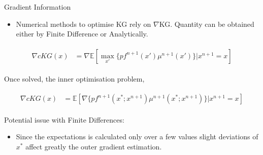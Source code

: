 \documentclass{beamer}
\begin{document}
\begin{frame}{Gradient Information}

\begin{itemize}
	\item Numerical methods to optimise KG rely on $\nabla$KG. Quantity can be obtained either by Finite Difference or Analytically. 
\end{itemize}

\begin{align*}
\begin{split}
\nabla cKG(x) &= \nabla \mathbb{E}[\max_{x'}\{pf^{n+1}(x')\mu^{n+1}(x')\}|x^{n+1}=x]
\end{split}
\end{align*}

Once solved, the inner optimisation problem, 

\begin{align*}
\begin{split}
\nabla cKG(x) &= \mathbb{E}[\nabla \{pf^{n+1}(x^{*};x^{n+1})\mu^{n+1}(x^{*};x^{n+1})\}|x^{n+1}=x]
\end{split}
\end{align*}

Potential issue with Finite Differences:
\begin{itemize}
	\item Since the expectations is calculated only over a few values slight deviations of $x^{*}$ affect greatly the outer gradient estimation. 
\end{itemize}

\end{frame}
\end{document}
